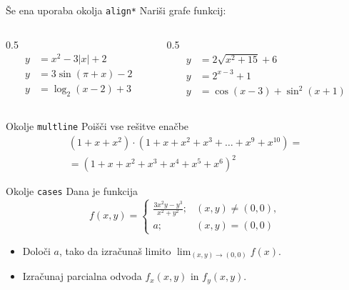 \begin{frame}{Še ena uporaba okolja \texttt{align*}}
	Nariši grafe funkcij:

		\begin{columns}
			\begin{column}{0.5\textwidth}
				\begin{align*}
					y &= x^2 - 3|x| + 2  \\
					y &= 3 \sin(\pi + x) - 2 \\
					y &= \log_2(x - 2) + 3
				\end{align*}
			\end{column}
	
			\begin{column}{0.5\textwidth}
				\begin{align*}
					y &= 2 \sqrt{x^2 + 15} + 6 \\
					y &= 2^{x - 3} + 1 \\
					y &= \cos(x - 3) + \sin^2(x + 1)
				\end{align*}
			\end{column}
		\end{columns}
	\end{frame}

\begin{frame}{Okolje \texttt{multline}}
	Poišči vse rešitve enačbe
	\begin{multline*}
		(1 + x + x^2) \cdot (1 + x + x^2 + x^3 + \ldots + x^9 + x^{10})= \\
		= (1 + x + x^2 + x^3 + x^4 + x^5 + x^6)^2
		\end{multline*}
\end{frame}

\begin{frame}{Okolje \texttt{cases}}
	Dana je funkcija
\[
  f(x,y) =
	\begin{cases}
		\frac{3x^2y-y^3}{x^2+y^2} ; &  (x,y) \neq (0,0), \\
		a; & (x,y)=(0,0)
	\end{cases}
\]		
	\begin{itemize}
	\item Določi $a$, tako da izračunaš limito \( \lim_{(x,y)\to(0,0)} f(x). \)
	\item Izračunaj parcialna odvoda $\displaystyle f_x(x,y)$ in $\displaystyle f_y(x,y)$.
	\end{itemize}
	
\end{frame}
